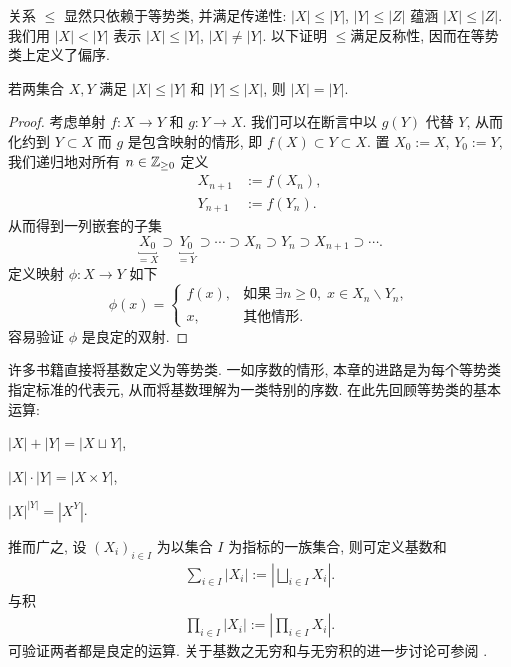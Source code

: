 关系 $\leq$ 显然只依赖于等势类, 并满足传递性: $|X| \leq |Y|$, $|Y| \leq |Z|$ 蕴涵 $|X| \leq |Z|$. 我们用 $|X| < |Y|$ 表示 $|X| \leq |Y|$, $|X| \neq |Y|$.  以下证明 $\leq $满足反称性, 因而在等势类上定义了偏序.

\begin{theorem}\label{prop:Schröder-Bernstein}
	若两集合 $X,Y$ 满足 $|X| \leq |Y|$ 和 $|Y| \leq |X|$, 则 $|X|=|Y|$.
\end{theorem}
\begin{proof}
	考虑单射 $f: X \to Y$ 和 $g: Y \to X$. 我们可以在断言中以 $g(Y)$ 代替 $Y$, 从而化约到 $Y \subset X$ 而 $g$ 是包含映射的情形, 即 $f(X) \subset Y \subset X$. 置 $X_0 := X$, $Y_0 := Y$, 我们递归地对所有 $n \in \mathbb{Z}_{\geq 0}$ 定义
	\begin{align*}
		X_{n+1} & := f(X_n), \\
		Y_{n+1} & := f(Y_n).
	\end{align*}
	从而得到一列嵌套的子集
	\[ \underbracket{X_0}_{=X} \supset \underbracket{Y_0}_{=Y} \supset \cdots \supset X_n \supset Y_n \supset X_{n+1} \supset \cdots . \]
	定义映射 $\phi: X \to Y$ 如下
	\[ \phi(x) = \begin{cases}
		f(x), & \text{如果}\; \exists n \geq 0, \; x \in X_n \smallsetminus Y_n, \\
		x, & \text{其他情形}.
	\end{cases} \]
	容易验证 $\phi$ 是良定的双射.
\end{proof}

许多书籍直接将基数定义为等势类. 一如序数的情形, 本章的进路是为每个等势类指定标准的代表元, 从而将基数理解为一类特别的序数. 在此先回顾等势类的基本运算:
\begin{compactenum}[(i)]
	\item $|X|+|Y| = |X \sqcup Y|$,
	\item $|X| \cdot |Y| = |X \times Y|$, 
	\item $|X|^{|Y|} = |X^Y|$.
\end{compactenum}
推而广之, 设 $(X_i)_{i \in I}$ 为以集合 $I$ 为指标的一族集合, 则可定义基数和
\begin{gather}\label{eqn:cardinal-infinite-sum}
	\sum_{i \in I} |X_i| := \left\lvert \bigsqcup_{i \in I} X_i \right\rvert.
\end{gather}
与积
\begin{gather}\label{eqn:cardinal-infinite-prod}
	\prod_{i \in I} |X_i| := \left\lvert \prod_{i \in I} X_i \right\rvert.
\end{gather}
可验证两者都是良定的运算. 关于基数之无穷和与无穷积的进一步讨论可参阅 \cite[pp.52-55]{Je03}.

